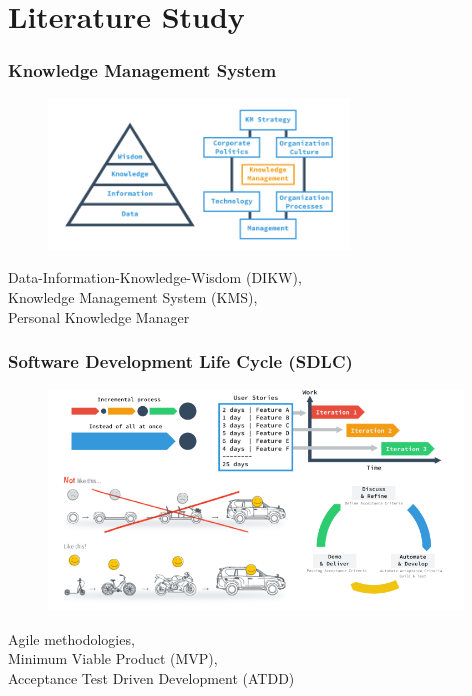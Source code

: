 \documentclass[10pt, compress]{beamer}
\begin{document}

\section{Literature Study}


\begin{frame}[fragile]
  \frametitle{Knowledge Management System}
  \centering

  \begin{figure}[ht]
    \vspace{-2cm}
    \includegraphics[width=8cm]{include/literature-kms.png}
  \end{figure}

  Data-Information-Knowledge-Wisdom (\alert{DIKW}),\\
  Knowledge Management System (\alert{KMS}),\\
  \alert{Personal Knowledge Manager}

\end{frame}


\begin{frame}[fragile]
  \frametitle{Software Development Life Cycle (SDLC)}
  \centering

  \begin{figure}[ht]
    \vspace{-1cm}
    \includegraphics[width=11cm]{include/literature-sdlc.png}
  \end{figure}

  \alert{Agile} methodologies,\\
  Minimum Viable Product (\alert{MVP}),\\
  Acceptance Test Driven Development (\alert{ATDD})

\end{frame}
\end{document}
